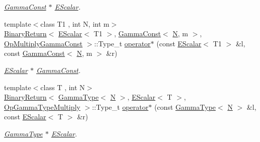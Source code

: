 \begin{DoxyCompactItemize}
\begin{DoxyCompactList}\small\item\em \mbox{\hyperlink{classENSEM_1_1GammaConst}{Gamma\+Const}} $\ast$ \mbox{\hyperlink{classENSEM_1_1EScalar}{E\+Scalar}}. \end{DoxyCompactList}\item 
{\footnotesize template$<$class T1 , int N, int m$>$ }\\\mbox{\hyperlink{structENSEM_1_1BinaryReturn}{Binary\+Return}}$<$ \mbox{\hyperlink{classENSEM_1_1EScalar}{E\+Scalar}}$<$ T1 $>$, \mbox{\hyperlink{classENSEM_1_1GammaConst}{Gamma\+Const}}$<$ \mbox{\hyperlink{operator__name__util_8cc_a7722c8ecbb62d99aee7ce68b1752f337}{N}}, m $>$, \mbox{\hyperlink{structENSEM_1_1OpMultiplyGammaConst}{Op\+Multiply\+Gamma\+Const}} $>$\+::Type\+\_\+t \mbox{\hyperlink{group__escalar_ga10de70ea3b5491035fab4f67de013321}{operator$\ast$}} (const \mbox{\hyperlink{classENSEM_1_1EScalar}{E\+Scalar}}$<$ T1 $>$ \&l, const \mbox{\hyperlink{classENSEM_1_1GammaConst}{Gamma\+Const}}$<$ \mbox{\hyperlink{operator__name__util_8cc_a7722c8ecbb62d99aee7ce68b1752f337}{N}}, m $>$ \&r)
\begin{DoxyCompactList}\small\item\em \mbox{\hyperlink{classENSEM_1_1EScalar}{E\+Scalar}} $\ast$ \mbox{\hyperlink{classENSEM_1_1GammaConst}{Gamma\+Const}}. \end{DoxyCompactList}\item 
{\footnotesize template$<$class T , int N$>$ }\\\mbox{\hyperlink{structENSEM_1_1BinaryReturn}{Binary\+Return}}$<$ \mbox{\hyperlink{classENSEM_1_1GammaType}{Gamma\+Type}}$<$ \mbox{\hyperlink{operator__name__util_8cc_a7722c8ecbb62d99aee7ce68b1752f337}{N}} $>$, \mbox{\hyperlink{classENSEM_1_1EScalar}{E\+Scalar}}$<$ T $>$, \mbox{\hyperlink{structENSEM_1_1OpGammaTypeMultiply}{Op\+Gamma\+Type\+Multiply}} $>$\+::Type\+\_\+t \mbox{\hyperlink{group__escalar_ga53bf11728d0f1f7fb9dea51cd221792d}{operator$\ast$}} (const \mbox{\hyperlink{classENSEM_1_1GammaType}{Gamma\+Type}}$<$ \mbox{\hyperlink{operator__name__util_8cc_a7722c8ecbb62d99aee7ce68b1752f337}{N}} $>$ \&l, const \mbox{\hyperlink{classENSEM_1_1EScalar}{E\+Scalar}}$<$ T $>$ \&r)
\begin{DoxyCompactList}\small\item\em \mbox{\hyperlink{classENSEM_1_1GammaType}{Gamma\+Type}} $\ast$ \mbox{\hyperlink{classENSEM_1_1EScalar}{E\+Scalar}}. \end{DoxyCompactList}\item 

\end{DoxyCompactItemize}
